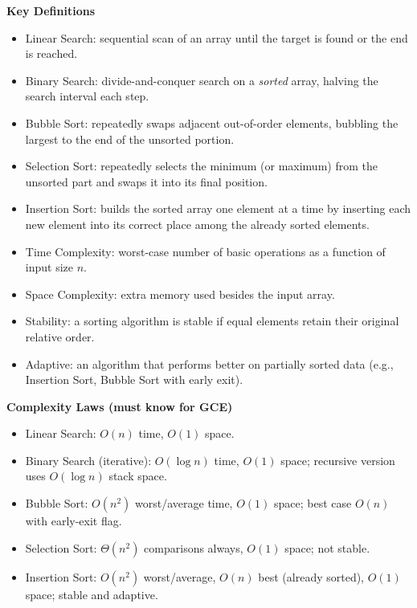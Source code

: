 \documentclass[11pt]{article}
\newcommand{\cle}[1]{{\popxbold\color{popdark}#1}}
\begin{document}
\begin{bilan}
\textbf{Key Definitions}
\begin{itemize}
\item \cle{Linear Search}: sequential scan of an array until the target is found or the end is reached.
\item \cle{Binary Search}: divide-and-conquer search on a \emph{sorted} array, halving the search interval each step.
\item \cle{Bubble Sort}: repeatedly swaps adjacent out-of-order elements, bubbling the largest to the end of the unsorted portion.
\item \cle{Selection Sort}: repeatedly selects the minimum (or maximum) from the unsorted part and swaps it into its final position.
\item \cle{Insertion Sort}: builds the sorted array one element at a time by inserting each new element into its correct place among the already sorted elements.
\item \cle{Time Complexity}: worst-case number of basic operations as a function of input size $n$.
\item \cle{Space Complexity}: extra memory used besides the input array.
\item \cle{Stability}: a sorting algorithm is stable if equal elements retain their original relative order.
\item \cle{Adaptive}: an algorithm that performs better on partially sorted data (e.g., Insertion Sort, Bubble Sort with early exit).
\end{itemize}

\textbf{Complexity Laws (must know for GCE)}
\begin{itemize}
\item Linear Search: $O(n)$ time, $O(1)$ space.
\item Binary Search (iterative): $O(\log n)$ time, $O(1)$ space; recursive version uses $O(\log n)$ stack space.
\item Bubble Sort: $O(n^2)$ worst/average time, $O(1)$ space; best case $O(n)$ with early-exit flag.
\item Selection Sort: $\Theta(n^2)$ comparisons always, $O(1)$ space; not stable.
\item Insertion Sort: $O(n^2)$ worst/average, $O(n)$ best (already sorted), $O(1)$ space; stable and adaptive.
\end{itemize}


\end{bilan}
\end{document}
